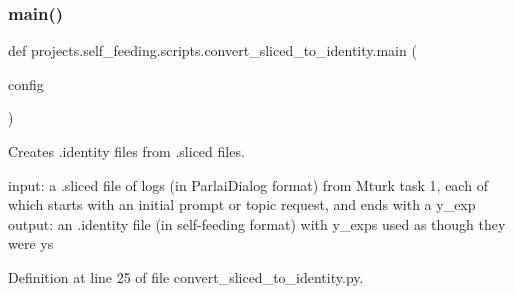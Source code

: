 \subsubsection{\texorpdfstring{main()}{main()}}
{\footnotesize\ttfamily def projects.\+self\+\_\+feeding.\+scripts.\+convert\+\_\+sliced\+\_\+to\+\_\+identity.\+main (\begin{DoxyParamCaption}\item[{}]{config }\end{DoxyParamCaption})}

\begin{DoxyVerb}Creates .identity files from .sliced files.

input: a .sliced file of logs (in ParlaiDialog format) from Mturk task 1, each of
    which starts with an initial prompt or topic request, and ends with a y_exp
output: an .identity file (in self-feeding format) with y_exps used as though they
    were ys
\end{DoxyVerb}
 

Definition at line 25 of file convert\+\_\+sliced\+\_\+to\+\_\+identity.\+py.


